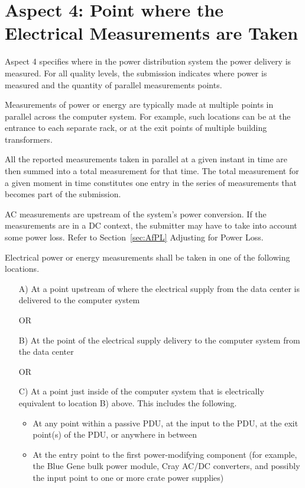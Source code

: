 \section{Aspect 4: Point where the Electrical Measurements are Taken}
\label{sec:A4wEMaT}
Aspect 4 specifies where in the power distribution system the power delivery is measured.  For all quality levels, the submission indicates where power is measured and the quantity of parallel measurements points.
\wl

\noindent
Measurements of power or energy are typically made at multiple points in parallel across the computer system. For example, such locations can be at the entrance to each separate rack, or at the exit points of multiple building transformers. 
\wl

\noindent
All the reported measurements taken in parallel at a given instant in time are then summed into a total measurement for that time.  The total measurement for a given moment in time constitutes one entry in the series of measurements that becomes part of the submission.
\wl

\noindent
AC measurements are upstream of the system's power conversion. If the measurements are in a DC context, the submitter may have to take into account some power loss. 
Refer to Section~\ref{sec:AfPL} Adjusting for Power Loss.
\wl

\noindent
Electrical power or energy measurements shall be taken in one of the following locations.

\begin{itemize}
\item[{A)}]
At a point upstream of where the electrical supply from the data center is delivered to the computer system

OR

\item[{B)}]
At the point of the electrical supply delivery to the computer system from the data center

OR

\item[{C)}]
At a point just inside of the computer system that is electrically equivalent to location B) above.  This includes the following. 

\begin{itemize}
\item
At any point within a passive PDU, at the input to the PDU, at the exit point(s) of the PDU, or anywhere in between 
\item
At the entry point to the first power-modifying component (for example, the Blue Gene bulk power module, Cray AC/DC converters, and possibly the input point to one or more crate power supplies)
\end{itemize}
\end{itemize}

